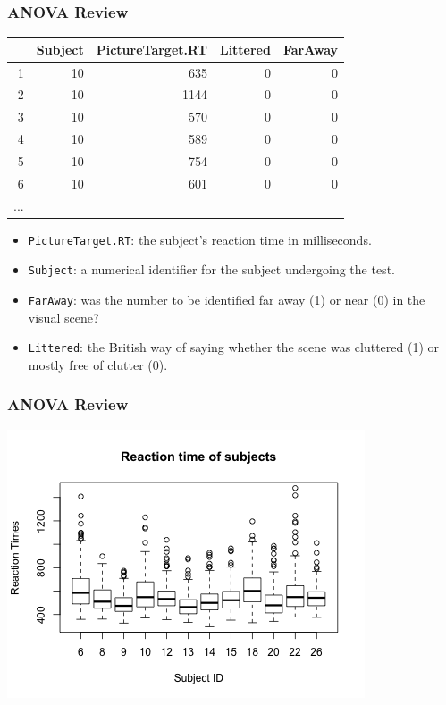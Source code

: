\documentclass[slidestop,compress,mathserif,12pt,t,professionalfonts,xcolor=table]{beamer}
\begin{document}

\begin{frame}[fragile]
  \frametitle{ANOVA Review}
  
\begin{center}
{\small
\begin{tabular}{rrrrr}
  \hline
 & Subject & PictureTarget.RT & Littered & FarAway \\ 
  \hline
1 &  10 & 635 &   0 &   0 \\ 
  2 &  10 & 1144 &   0 &   0 \\ 
  3 &  10 & 570 &   0 &   0 \\ 
  4 &  10 & 589 &   0 &   0 \\ 
  5 &  10 & 754 &   0 &   0 \\ 
  6 &  10 & 601 &   0 &   0 \\ 
  ... \\
   \hline
\end{tabular}
}
\end{center}

\small
\begin{itemize}
\item \texttt{PictureTarget.RT}: the subject's reaction time in milliseconds.
\item \texttt{Subject}: a numerical identifier for the subject undergoing the test.
\item \texttt{FarAway}: was the number to be identified far away (1) or near (0) in the visual scene?
\item \texttt{Littered}: the British way of saying whether the scene was cluttered (1) or mostly free of clutter (0).
\end{itemize}

\end{frame}



\begin{frame}
  \frametitle{ANOVA Review}


  \begin{center}
  \includegraphics[scale=0.65]{figures/rxntime-boxplots.png}
  \end{center}

\end{frame}
\end{document}
